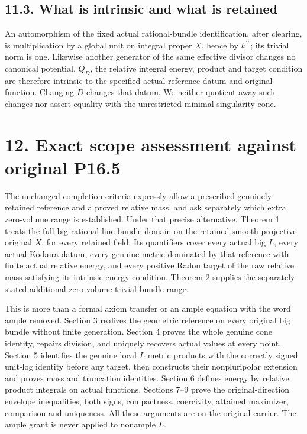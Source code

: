 \documentclass[
  10pt,
]{article}
\begin{document}
\subsection{11.3. What is intrinsic and what is
retained}\label{what-is-intrinsic-and-what-is-retained}

An automorphism of the fixed actual rational-bundle identification,
after clearing, is multiplication by a global unit on integral proper
\(X\), hence by \(k^\times\); its trivial norm is one. Likewise another
generator of the same effective divisor changes no canonical potential.
\(Q_D\), the relative integral energy, product and target condition are
therefore intrinsic to the specified actual reference datum and original
function. Changing \(D\) changes that datum. We neither quotient away
such changes nor assert equality with the unrestricted
minimal-singularity cone.

\section{12. Exact scope assessment against original
P16.5}\label{exact-scope-assessment-against-original-p16.5}

The unchanged completion criteria expressly allow a prescribed genuinely
retained reference and a proved relative mass, and ask separately which
extra zero-volume range is established. Under that precise alternative,
Theorem 1 treats the full big rational-line-bundle domain on the
retained smooth projective original \(X\), for every retained field. Its
quantifiers cover every actual big \(L\), every actual Kodaira datum,
every genuine metric dominated by that reference with finite actual
relative energy, and every positive Radon target of the raw relative
mass satisfying its intrinsic energy condition. Theorem 2 supplies the
separately stated additional zero-volume trivial-bundle range.

This is more than a formal axiom transfer or an ample equation with the
word ample removed. Section 3 realizes the geometric reference on every
original big bundle without finite generation. Section 4 proves the
whole genuine cone identity, repairs division, and uniquely recovers
actual values at every point. Section 5 identifies the genuine local
\(L\) metric products with the correctly signed unit-log identity before
any target, then constructs their nonpluripolar extension and proves
mass and truncation identities. Section 6 defines energy by relative
product integrals on actual functions. Sections 7--9 prove the
original-direction envelope inequalities, both signs, compactness,
coercivity, attained maximizer, comparison and uniqueness. All these
arguments are on the original carrier. The ample grant is never applied
to nonample \(L\).
\end{document}
